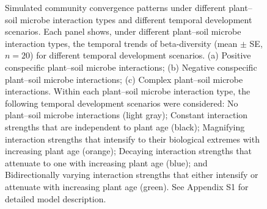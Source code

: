 \newpage
\begin{figure}
	\centering
	\caption[Simulated community convergence patterns under different plant--soil microbe interaction types and different temporal development scenarios.]
		{\hspace{1mm} 
		Simulated community convergence patterns under different plant--soil microbe interaction types and different temporal development scenarios.
		Each panel shows, under different plant--soil microbe interaction types, the temporal trends of beta-diversity (mean $\pm$ SE, $n = 20$) for different temporal development scenarios.
		(a) Positive conspecific plant--soil microbe interactions; (b) Negative conspecific plant--soil microbe interactions; (c) Complex plant--soil microbe interactions.
		Within each plant--soil microbe interaction type, the following temporal development scenarios were considered: 
		No plant--soil microbe interactions (light gray); Constant interaction strengths that are independent to plant age (black); Magnifying interaction strengths that intensify to their biological extremes with increasing plant age (orange); Decaying interaction strengths that attenuate to one with increasing plant age (blue); and Bidirectionally varying interaction strengths that either intensify or attenuate with increasing plant age (green). See Appendix S1 for detailed model description.}
	\label{fig:SimulationAllPSF}
\end{figure}


